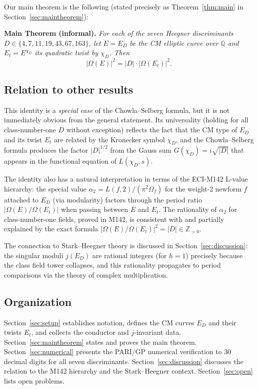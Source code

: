 \documentclass[12pt,a4paper]{article}
\theoremstyle{plain}
\theoremstyle{definition}
\newcommand{\Q}{\mathbb{Q}}
\newcommand{\Z}{\mathbb{Z}}
\begin{document}
Our main theorem is the following (stated precisely as Theorem~\ref{thm:main}
in Section~\ref{sec:maintheorem}):

\medskip
\noindent\textbf{Main Theorem (informal).}
\emph{For each of the seven Heegner discriminants $D \in \{4, 7, 11, 19, 43, 67, 163\}$,
let $E = E_D$ be the CM elliptic curve over $\Q$ and $E_t = E^{\chi_D}$ its
quadratic twist by $\chi_D$.  Then}
\[
  \bigl|\Omega(E)\bigr|^2 = |D| \cdot \bigl|\Omega(E_t)\bigr|^2.
\]

\subsection{Relation to other results}

This identity is a \emph{special case} of the Chowla--Selberg formula, but
it is not immediately obvious from the general statement.  Its universality
(holding for all class-number-one $D$ without exception) reflects the fact
that the CM type of $E_D$ and its twist $E_t$ are related by the Kronecker
symbol $\chi_D$, and the Chowla--Selberg formula produces the factor
$|D|^{1/2}$ from the Gauss sum $G(\chi_D) = i\sqrt{|D|}$ that appears in
the functional equation of $L(\chi_D, s)$.

The identity also has a natural interpretation in terms of the ECI-M142
L-value hierarchy: the special value $\alpha_2 = L(f, 2)/(\pi^2 \Omega_f)$
for the weight-2 newform $f$ attached to $E_D$ (via modularity) factors
through the period ratio $|\Omega(E)/\Omega(E_t)|$ when passing between $E$
and $E_t$.  The rationality of $\alpha_2$ for class-number-one fields, proved
in M142, is consistent with and partially explained by the exact formula
$|\Omega(E)/\Omega(E_t)|^2 = |D| \in \Z_{>0}$.

The connection to Stark--Heegner theory is discussed in
Section~\ref{sec:discussion}: the singular moduli $j(E_D)$ are rational
integers (for $h = 1$) precisely because the class field tower collapses,
and this rationality propagates to period comparisons via the theory of
complex multiplication.

\subsection{Organization}

Section~\ref{sec:setup} establishes notation, defines the CM curves $E_D$
and their twists $E_t$, and collects the conductor and $j$-invariant data.
Section~\ref{sec:maintheorem} states and proves the main theorem.
Section~\ref{sec:numerical} presents the PARI/GP numerical verification to
30 decimal digits for all seven discriminants.
Section~\ref{sec:discussion} discusses the relation to the M142 hierarchy
and the Stark--Heegner context.
Section~\ref{sec:open} lists open problems.
\end{document}

